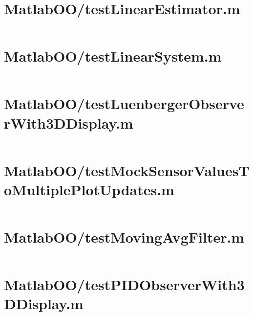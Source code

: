 \pagebreak
\section{MatlabOO/testLinearEstimator.m}\label{code:MatlabOO/testLinearEstimator.m}
\inputminted[linenos,fontsize=\scriptsize]{matlab}{/home/dcouture/git/mathyourlife/TSatPy/beta_versions/matlab_object_oriented/testLinearEstimator.m}

\pagebreak
\section{MatlabOO/testLinearSystem.m}\label{code:MatlabOO/testLinearSystem.m}
\inputminted[linenos,fontsize=\scriptsize]{matlab}{/home/dcouture/git/mathyourlife/TSatPy/beta_versions/matlab_object_oriented/testLinearSystem.m}

\pagebreak
\section{MatlabOO/testLuenbergerObserverWith3DDisplay.m}\label{code:MatlabOO/testLuenbergerObserverWith3DDisplay.m}
\inputminted[linenos,fontsize=\scriptsize]{matlab}{/home/dcouture/git/mathyourlife/TSatPy/beta_versions/matlab_object_oriented/testLuenbergerObserverWith3DDisplay.m}

\pagebreak
\section{MatlabOO/testMockSensorValuesToMultiplePlotUpdates.m}\label{code:MatlabOO/testMockSensorValuesToMultiplePlotUpdates.m}
\inputminted[linenos,fontsize=\scriptsize]{matlab}{/home/dcouture/git/mathyourlife/TSatPy/beta_versions/matlab_object_oriented/testMockSensorValuesToMultiplePlotUpdates.m}

\pagebreak
\section{MatlabOO/testMovingAvgFilter.m}\label{code:MatlabOO/testMovingAvgFilter.m}
\inputminted[linenos,fontsize=\scriptsize]{matlab}{/home/dcouture/git/mathyourlife/TSatPy/beta_versions/matlab_object_oriented/testMovingAvgFilter.m}

\pagebreak
\section{MatlabOO/testPIDObserverWith3DDisplay.m}\label{code:MatlabOO/testPIDObserverWith3DDisplay.m}
\inputminted[linenos,fontsize=\scriptsize]{matlab}{/home/dcouture/git/mathyourlife/TSatPy/beta_versions/matlab_object_oriented/testPIDObserverWith3DDisplay.m}

